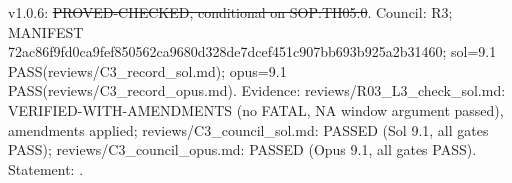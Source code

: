 \begin{theorem}\label{reg:W2-APP_Thm-LOC}
\end{theorem}
\begin{statusbox}
 v1.0.6: \st{PROVED-CHECKED, conditional on SOP:TH05.0}. Council: R3; MANIFEST 72ac86f9fd0ca9fef850562ca9680d328de7dcef451c907bb693b925a2b31460; sol=9.1 PASS(reviews/C3\_record\_sol.md); opus=9.1 PASS(reviews/C3\_record\_opus.md). Evidence: reviews/R03\_L3\_check\_sol.md: VERIFIED-WITH-AMENDMENTS (no FATAL, NA window argument passed), amendments applied; reviews/C3\_council\_sol.md: PASSED (Sol 9.1, all gates PASS); reviews/C3\_council\_opus.md: PASSED (Opus 9.1, all gates PASS). Statement: .
\end{statusbox}
